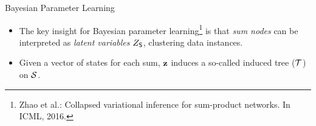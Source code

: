 \begin{frame}{Bayesian Parameter Learning}
  \begin{itemize}
    \item The key insight for Bayesian parameter learning\footnote{\scriptsize Zhao et al.: Collapsed variational inference for sum-product networks. In ICML, 2016.}
        is that \emph{sum nodes} can be interpreted as \emph{latent variables} $Z_{\mathsf{S}}$, clustering data instances.
    \item Given a vector of states for each sum, $\mathbf{z}$ induces a so-called induced tree ($\mathcal{T}$) on $\mathcal{S}$.
  \end{itemize}
  \begin{figure}
  \centering{
    
    }
\end{figure}
\end{frame}
\fi

%
%
%
%
%
%
%
%
%
%
%
%
%
%
%
%
%
%
%
%
%
%
